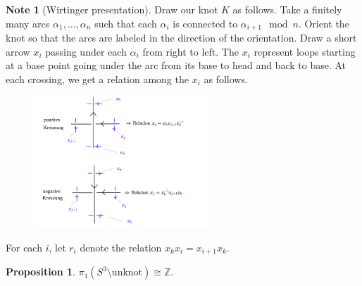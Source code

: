 \documentclass[10pt,letterpaper,cm]{nupset}
\theoremstyle{definition}
\newtheorem{note}[definition]{Note}
\theoremstyle{theorem}
\newtheorem{prop}[definition]{Proposition}
\theoremstyle{remark}
\newcommand{\Z}{\mathbb Z}
\newcommand{\1}{\mathbb{1}}
\newcommand{\0}{\vec 0}
\begin{document}
\begin{note}[Wirtinger presentation] 
Draw our knot $K$ as follows. Take a finitely many arcs $\alpha_1, \ldots, \alpha_n$ such that each $\alpha_i$ is connected to $\alpha_{i+1} \mod n$. Orient the knot so that the arcs are labeled in the direction of the orientation. Draw a short arrow $x_i$ passing under each $\alpha_i$ from right to left. The $x_i$ represent loops starting at a base point going under the arc from its base to head and back to base. At each crossing, we get a relation among the $x_i$ as follows.
\begin{figure}[H]
\centering
\includegraphics[width=65mm]{Wirtinger_presentation.png}
\end{figure}
For each $i$, let $r_i$ denote the relation $x_kx_i = x_{i+1}x_k$.
\end{note}

\begin{prop}
$\pi_1(S^3 \setminus \text{unknot})\cong \Z$.
\end{prop}
\end{document}
